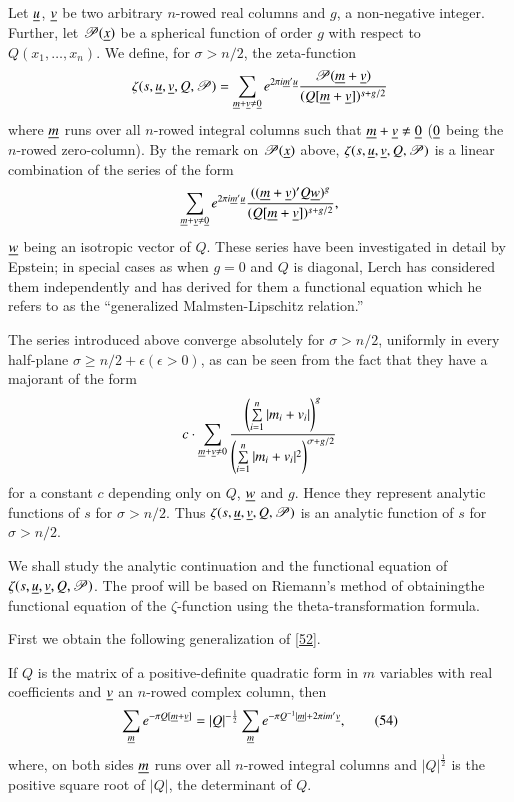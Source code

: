 Let $\underline{u}$, $\underline{v}$ be two arbitrary $n$-rowed real columns and
$g$, a non-negative integer. Further, let $\mathscr{P}(\underline{x})$ be a
spherical function of order $g$ with respect to
$Q(x_{1},\ldots,x_{n})$. We define, for $\sigma>n/2$, the
zeta-function
$$
\zeta(s,\underline{u},\underline{v},Q,\mathscr{P})=\sum_{\underline{m}+\underline{v}\neq
  \underline{0}}e^{2\pi
  i\underline{m}'\underline{u}}\frac{\mathscr{P}(\underline{m}+\underline{v})}{(Q[\underline{m}+\underline{v}])^{s+g/2}}
$$
where $\underline{m}$ runs over all $n$-rowed integral columns such that
$\underline{m}+\underline{v}\neq \underline{0}$ ($\underline{0}$ being the $n$-rowed
zero-column). By the remark on $\mathscr{P}(\underline{x})$ above,
$\zeta(s,\underline{u},\underline{v},Q,\mathscr{P})$ is a linear combination of the
series of the form
$$
\sum_{\underline{m}+\underline{v}\neq \underline{0}}e^{2\pi
  i\underline{m}'\underline{u}}\frac{((\underline{m}+\underline{v})'Q\underline{w})^{g}}{(Q[\underline{m}+\underline{v}])^{s+g/2}}, 
$$
$\underline{w}$ being an isotropic vector of $Q$. These series have been
investigated in detail by Epstein; in special cases as when $g=0$ and
$Q$ is diagonal, Lerch has considered them independently and has
derived for them a functional equation which he refers to as the
``generalized Malmsten-Lipschitz relation.''

The series introduced above converge absolutely for $\sigma>n/2$,
uniformly in every half-plane $\sigma\geq n/2+\epsilon(\epsilon>0)$,
as can be seen from the fact that they have a majorant of the form
$$
c\cdot \sum_{\underline{m}+\underline{v}\neq
  0}\frac{\left(\sum\limits^{n}_{i=1}|m_{i}+v_{i}|\right)^{g}}{\left(\sum\limits^{n}_{i=1}|m_{i}+v_{i}|^{2}\right)^{\sigma+g/2}}
$$
for a constant $c$ depending only on $Q$, $\underline{w}$ and $g$. Hence they
represent analytic functions of $s$ for $\sigma>n/2$. Thus
$\zeta(s,\underline{u},\underline{v},Q,\mathscr{P})$ is an analytic function of $s$
for $\sigma>n/2$.

We shall study the analytic continuation and the functional equation
of $\zeta(s,\underline{u},\underline{v},Q,\mathscr{P})$. The proof will be based on
Riemann's method of obtaining\pageoriginale the functional equation of
the $\zeta$-function using the theta-transformation formula.

First we obtain the following generalization of \eqref{52}.

\begin{proposition}\label{prop7}
If $Q$ is the matrix of a positive-definite quadratic form in $m$
variables with real coefficients and $\underline{v}$ an $n$-rowed complex
column, then 
\begin{equation*}
\sum_{\underline{m}}e^{-\pi
  Q[\underline{m}+\underline{v}]}=|Q|^{-\frac{1}{2}}\sum_{\underline{m}}e^{-\pi
  Q^{-1}|\underline{m}|+2\pi i m' \underline{v}},\tag{54}\label{54}
\end{equation*}
where, on both sides $\underline{m}$ runs over all $n$-rowed integral columns
and $|Q|^{\frac{1}{2}}$ is the positive square root of $|Q|$, the
determinant of $Q$.
\end{proposition}

